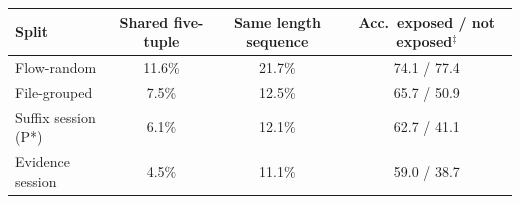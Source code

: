 \begin{tabular}{lccc}
\toprule
Split & Shared five-tuple & Same length sequence & Acc.\ exposed / not exposed$^\ddagger$ \\
\midrule
Flow-random & 11.6\% & 21.7\% & 74.1 / 77.4 \\
File-grouped & 7.5\% & 12.5\% & 65.7 / 50.9 \\
Suffix session (P*) & 6.1\% & 12.1\% & 62.7 / 41.1 \\
Evidence session & 4.5\% & 11.1\% & 59.0 / 38.7 \\
\bottomrule
\end{tabular}
